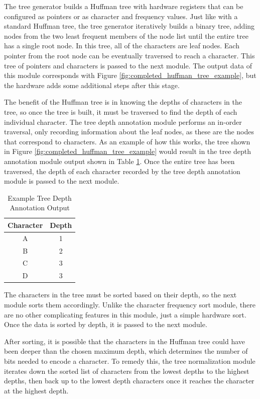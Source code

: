 \documentclass[doublespace,nopageskip]{VTthesis}
\begin{document}
The tree generator builds a Huffman tree with hardware registers that can be configured as pointers or as character and frequency values. Just like with a standard Huffman tree, the tree generator iteratively builds a binary tree, adding nodes from the two least frequent members of the node list until the entire tree has a single root node. In this tree, all of the characters are leaf nodes. Each pointer from the root node can be eventually traversed  to reach a character. This tree of pointers and characters is passed to the next module. The output data of this module corresponds with Figure \ref{fig:completed_huffman_tree_example}, but the hardware adds some additional steps after this stage.

The benefit of the Huffman tree is in knowing the depths of characters in the tree, so once the tree is built, it must be traversed to find the depth of each individual character. The tree depth annotation module performs an in-order traversal, only recording information about the leaf nodes, as these are the nodes that correspond to characters. As an example of how this works, the tree shown in Figure \ref{fig:completed_huffman_tree_example} would result in the tree depth annotation module output shown in Table \ref{tab:tree_depth_annotation_output}. Once the entire tree has been traversed, the depth of each character recorded by the tree depth annotation module is passed to the next module.

\begin{table}[htb]
	\centering
	\caption{Example Tree Depth Annotation Output}
	\begin{tabular}{cc}
	    \toprule
	    Character & Depth \\
	    \midrule
	    A & 1 \\
	    \midrule
	    B & 2 \\
	    \midrule
	    C & 3 \\
	    \midrule
	    D & 3 \\
	    \bottomrule
	\end{tabular}
	\label{tab:tree_depth_annotation_output}
\end{table}

The characters in the tree must be sorted based on their depth, so the next module sorts them accordingly. Unlike the character frequency sort module, there are no other complicating features in this module, just a simple hardware sort. Once the data is sorted by depth, it is passed to the next module.

After sorting, it is possible that the characters in the Huffman tree could have been deeper than the chosen maximum depth, which determines the number of bits needed to encode a character. To remedy this, the tree normalization module iterates down the sorted list of characters from the lowest depths to the highest depths, then back up to the lowest depth characters once it reaches the character at the highest depth.
\end{document}
